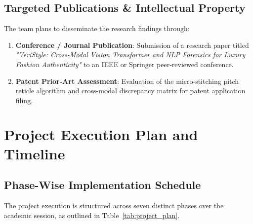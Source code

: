 \documentclass[a4paper,12pt]{report}
\begin{document}
\section{Targeted Publications \& Intellectual Property}
The team plans to disseminate the research findings through:
\begin{enumerate}
    \item \textbf{Conference / Journal Publication}: Submission of a research paper titled \textit{"VeriStyle: Cross-Modal Vision Transformer and NLP Forensics for Luxury Fashion Authenticity"} to an IEEE or Springer peer-reviewed conference.
    \item \textbf{Patent Prior-Art Assessment}: Evaluation of the micro-stitching pitch reticle algorithm and cross-modal discrepancy matrix for patent application filing.
\end{enumerate}

\newpage

\chapter{Project Execution Plan and Timeline}

\section{Phase-Wise Implementation Schedule}
The project execution is structured across seven distinct phases over the academic session, as outlined in Table~\ref{tab:project_plan}.
\end{document}
